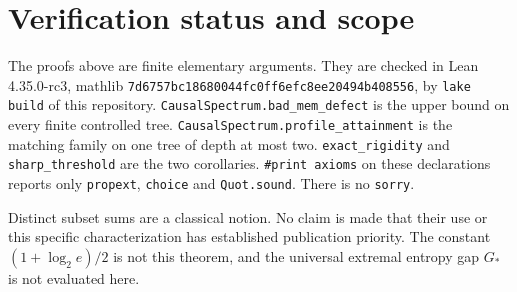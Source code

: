 \documentclass[11pt]{article}
\begin{document}
\section{Verification status and scope}
The proofs above are finite elementary arguments. They are checked in Lean 4.35.0-rc3, mathlib \texttt{7d6757bc18680044fc0ff6efc8ee20494b408556}, by \texttt{lake build} of this repository. \texttt{CausalSpectrum.bad\_mem\_defect} is the upper bound on every finite controlled tree. \texttt{CausalSpectrum.profile\_attainment} is the matching family on one tree of depth at most two. \texttt{exact\_rigidity} and \texttt{sharp\_threshold} are the two corollaries. \texttt{\#print axioms} on these declarations reports only \texttt{propext}, \texttt{choice} and \texttt{Quot.sound}. There is no \texttt{sorry}.

Distinct subset sums are a classical notion. No claim is made that their use or this specific characterization has established publication priority. The constant $(1+\log_2 e)/2$ is not this theorem, and the universal extremal entropy gap $G_*$ is not evaluated here.
\end{document}

